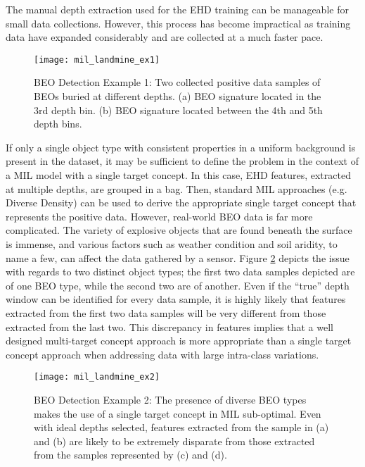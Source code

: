 \documentclass[12pt,dvips]{report}
\numberwithin{equation}{section}
\begin{document}
The manual depth extraction used for the EHD training can be manageable
for small data collections. However, this process has become impractical
as training data have expanded considerably and are collected at a
much faster pace. 

\begin{figure}
\texttt{[image: mil\_landmine\_ex1]}

\caption{BEO Detection Example 1: Two collected positive data samples
of BEOs buried at different depths. (a) BEO signature located
in the 3rd depth bin. (b) BEO signature located between the 4th and
5th depth bins.\label{fig:Landmine-Detection-Ex1}}
\end{figure}


If only a single object type with consistent properties in a uniform background is present in
the dataset, it may be sufficient to define the problem in the context
of a MIL model with a single target concept. In this case, EHD features,
extracted at multiple depths, are grouped in a bag. Then, standard
MIL approaches (e.g. Diverse Density) can be used to derive the appropriate
single target concept that represents the positive data. However,
real-world BEO data is far more complicated. The variety of explosive
objects that are found beneath the surface is immense, and various
factors such as weather condition and soil aridity, to name a few,
can affect the data gathered by a sensor. Figure \ref{fig:Landmine-Detection-Ex2}
depicts the issue with regards to two distinct object types; the first
two data samples depicted are of one BEO type, while the second two
are of another. Even if the ``true'' depth window can be identified
for every data sample, it is highly likely that features extracted
from the first two data samples will be very different from those
extracted from the last two. This discrepancy in features implies that a well designed multi-target concept approach is more
appropriate than a single target concept approach when addressing
data with large intra-class variations.

\begin{figure}
\texttt{[image: mil\_landmine\_ex2]}

\caption{BEO Detection Example 2: The presence of diverse BEO types
makes the use of a single target concept in MIL sub-optimal.
Even with ideal depths selected, features extracted from the sample
in (a) and (b) are likely to be extremely disparate from those extracted
from the samples represented by (c) and (d). \label{fig:Landmine-Detection-Ex2}}
\end{figure}
\end{document}
